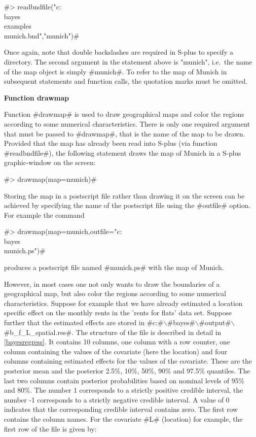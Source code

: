 #> readbndfile("c:\\bayes\\examples\\munich.bnd","munich")#

Once again, note that double backslashes are required in S-plus to
specify a directory. The second argument in the statement above is
"munich", i.e.~the name of the map object is simply #munich#. To
refer to the map of Munich in subsequent statements and function
calls, the quotation marks must be omitted.

{\bf Function drawmap}
\medskip
{}

Function #drawmap# is used to draw geographical maps and color the
regions according to some numerical characteristics. There is only
one required argument that must be passed to #drawmap#, that is
the name of the map to be drawn. Provided that the map has already
been read into S-plus (via function #readbndfile#), the following
statement draws the map of Munich in a S-plus graphic-window on
the screen:

#> drawmap(map=munich)#

Storing the map in a postscript file rather than drawing it on the
screen can be achieved by specifying the name of the postscript
file using the #outfile# option. For example the command

#> drawmap(map=munich,outfile="c:\\bayes\\munich.ps")#

produces a postscript file named #munich.ps# with the map of
Munich.

However, in most cases one not only wants to draw the boundaries
of a geographical map, but also color the regions according to
some numerical characteristics. Suppose for example that we have
already estimated a location specific effect on the monthly rents
in the 'rents for flats' data set. Suppose further that the
estimated effects are stored in
#c:#$\backslash$#bayes#$\backslash$#output#$\backslash$#b_f_L_spatial.res#.
The structure of the file is described in detail in
\autoref{bayesregress}. It contains 10 columns, one column with a
row counter, one column containing the values of the covariate
(here the location) and four columns containing estimated effects
for the values of the covariate. These are the posterior mean and
the posterior 2.5\%, 10\%, 50\%, 90\% and 97.5\% quantiles. The
last two columns contain posterior probabilities based on nominal
levels of 95\% and 80\%. The number 1 corresponds to a strictly
positive credible interval, the number -1 corresponds to a
strictly negative credible interval. A value of 0 indicates that
the corresponding credible interval contains zero. The first row
contains the column names. For the covariate #L# (location) for
example, the  first row of the file is given by:

